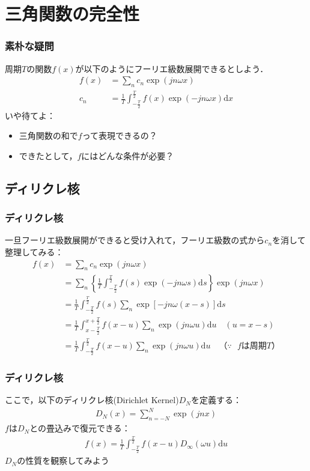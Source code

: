 \documentclass[dvipdfmx,graphicx,14pt]{beamer}
\begin{document}
\section{三角関数の完全性}

\begin{frame}[c]
    \frametitle{素朴な疑問}
    周期$T$の関数$f(x)$が以下のようにフーリエ級数展開できるとしよう．
    \begin{align*}
        f(x) &= \sum_{n} c_{n} \exp(jn\omega x) \\
        c_{n} &= \frac{1}{T} \int_{-\frac{T}{2}}^{\frac{T}{2}} f(x) \exp(-jn\omega x) \mathrm{d} x
    \end{align*}
    いや待てよ：
    \begin{itemize}
        \item 三角関数の和で$f$って表現できるの？
        \item できたとして，$f$にはどんな条件が必要？
    \end{itemize}
\end{frame}

\subsection{ディリクレ核}

\begin{frame}[c]
    \frametitle{ディリクレ核}
    一旦フーリエ級数展開ができると受け入れて，フーリエ級数の式から$c_{n}$を消して整理してみる：
    \footnotesize
    \begin{align*}
        f(x) &= \sum_{n} c_{n} \exp(jn\omega x) \\
         &= \sum_{n} \left\{ \frac{1}{T} \int_{-\frac{T}{2}}^{\frac{T}{2}} f(s) \exp(-jn\omega s) \mathrm{d} s \right\} \exp(jn\omega x) \\
         &= \frac{1}{T} \int_{-\frac{T}{2}}^{\frac{T}{2}} f(s) \sum_{n} \exp[-jn\omega(x-s)] \mathrm{d} s \\
         &= \frac{1}{T} \int_{x-\frac{T}{2}}^{x+\frac{T}{2}} f(x-u) \sum_{n} \exp(jn\omega u) \mathrm{d} u  \quad (u = x - s) \\
         &= \frac{1}{T} \int_{-\frac{T}{2}}^{\frac{T}{2}} f(x-u) \sum_{n} \exp(jn\omega u) \mathrm{d} u \quad \text{（$\because$ $f$は周期$T$）}
    \end{align*}
\end{frame}

\begin{frame}[c]
    \frametitle{ディリクレ核}
    ここで，以下のディリクレ核(Dirichlet Kernel)$D_{N}$を定義する：
    \begin{align}
        D_{N}(x) = \sum_{n=-N}^{N} \exp(jnx)
    \end{align}
    $f$は$D_{N}$との畳込みで復元できる：
    \begin{align*}
        f(x) = \frac{1}{T} \int_{-\frac{T}{2}}^{\frac{T}{2}} f(x-u) D_{\infty}(\omega u) \mathrm{d} u
    \end{align*}
    $D_{N}$の性質を観察してみよう
\end{frame}
\end{document}

